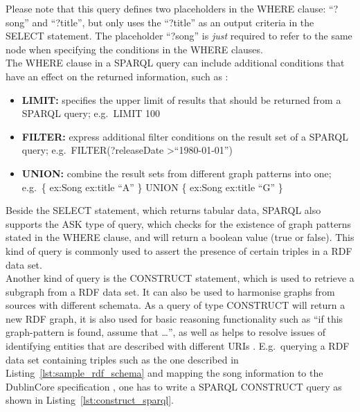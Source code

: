 
Please note that this query defines two placeholders in the WHERE clause: ``?song'' and ``?title'', but only uses the ``?title'' as an output criteria in the SELECT statement. The placeholder ``?song'' is \emph{just} required to refer to the same node when specifying the conditions in the WHERE clauses. \\

The WHERE clause in a \gls{SPARQL} query can include additional conditions that have an effect on the returned information, such as \citep[pg. 66-112]{allemang2011semantic}: \@

\begin{itemize}
	\item \textbf{LIMIT:} specifies the upper limit of results that should be returned from a \gls{SPARQL} query; e.g.\ LIMIT 100
	\item \textbf{FILTER:} express additional filter conditions on the result set of a \gls{SPARQL} query; e.g.\ FILTER(?releaseDate \textgreater ``1980-01-01'')
	\item \textbf{UNION:} combine the result sets from different graph patterns into one; e.g.\ \{ ex:Song ex:title ``A'' \} UNION \{ ex:Song ex:title ``G'' \}
\end{itemize}

Beside the SELECT statement, which returns tabular data, \gls{SPARQL} also supports the ASK type of query, which checks for the existence of graph patterns stated in the WHERE clause, and will return a boolean value (true or false). This kind of query is commonly used to assert the presence of certain triples in a \gls{RDF} data set. \\

Another kind of query is the CONSTRUCT statement, which is used to retrieve a subgraph from a \gls{RDF} data set. It can also be used to harmonise graphs from sources with different schemata. As a query of type CONSTRUCT will return a new \gls{RDF} graph, it is also used for basic reasoning functionality such as ``if this graph-pattern is found, assume that \ldots'', as well as helps to resolve issues of identifying entities that are described with different \gls{URI}s \citep[pg. 88-98]{allemang2011semantic}.
E.g.\ querying a \gls{RDF} data set containing triples such as the one described in Listing~\ref{lst:sample_rdf_schema} and mapping the song information to the DublinCore specification \citep{DublinCore}, one has to write a \gls{SPARQL} CONSTRUCT query as shown in Listing~\ref{lst:construct_sparql}. \@

